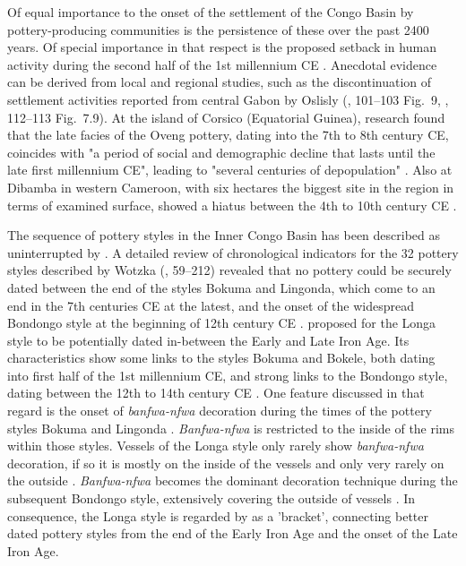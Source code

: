 \documentclass[smallextended,natbib]{svjour3}       %
\begin{document}
Of equal importance to the onset of the settlement of the Congo Basin by pottery-producing communities is the persistence of these over the past 2400 years. Of special importance in that respect is the proposed setback in human activity during the second half of the 1st millennium CE \citep{Seidensticker.2021}. Anecdotal evidence can be derived from local and regional studies, such as the discontinuation of settlement activities reported from central Gabon by Oslisly (\citeyear{Oslisly.1998}, 101--103 Fig.~9, \citeyear{Oslisly.2001a}, 112--113 Fig.~7.9). At the island of Corsico (Equatorial Guinea), research found that the late facies of the Oveng pottery, dating into the 7th to 8th century CE, coincides with "a period of social and demographic decline that lasts until the late first millennium CE", leading to "several centuries of depopulation" \citep[355--356]{SanchezElipe.2016}. Also at Dibamba in western Cameroon, with six hectares the biggest site in the region in terms of examined surface, showed a hiatus between the 4th to 10th century CE \citep{Saulieu.2017}.

The sequence of pottery styles in the Inner Congo Basin has been described as uninterrupted by \citet{Wotzka.1995}. A detailed review of chronological indicators for the 32 pottery styles described by Wotzka (\citeyear{Wotzka.1995}, 59--212) revealed that no pottery could be securely dated between the end of the styles Bokuma and Lingonda, which come to an end in the 7th centuries CE at the latest, and the onset of the widespread Bondongo style at the beginning of 12th century CE \citep[Fig.~S1; Tab.~S1;][193--204]{Seidensticker.2021e}. \citet[121--128]{Wotzka.1995} proposed for the Longa style to be potentially dated in-between the Early and Late Iron Age. Its characteristics show some links to the styles Bokuma and Bokele, both dating into first half of the 1st millennium CE, and strong links to the Bondongo style, dating between the 12th to 14th century CE \citep[127]{Wotzka.1995}. One feature discussed in that regard is the onset of \textit{banfwa-nfwa} decoration during the times of the pottery styles Bokuma and Lingonda \citep[109--111,117--118]{Wotzka.1995}. \textit{Banfwa-nfwa} is restricted to the inside of the rims within those styles. Vessels of the Longa style only rarely show \textit{banfwa-nfwa} decoration, if so it is mostly on the inside of the vessels and only very rarely on the outside \citep[124]{Wotzka.1995}. \textit{Banfwa-nfwa} becomes the dominant decoration technique during the subsequent Bondongo style, extensively covering the outside of vessels \citep[131--134]{Wotzka.1995}. In consequence, the Longa style is regarded by \citet[125--128]{Wotzka.1995} as a 'bracket', connecting better dated pottery styles from the end of the Early Iron Age and the onset of the Late Iron Age.
\end{document}
